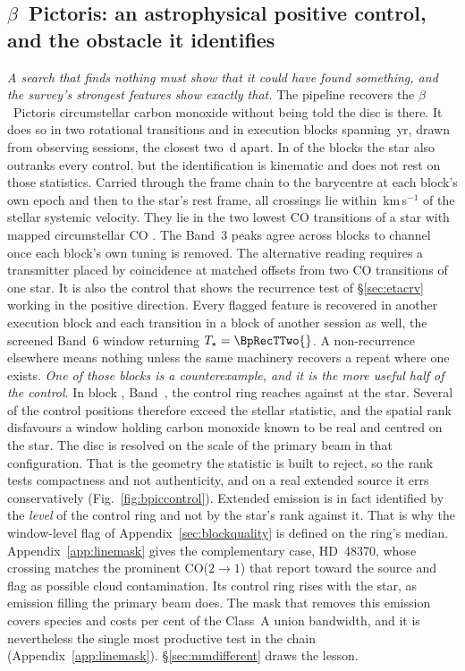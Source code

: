\subsection{$\beta$~Pictoris: an astrophysical positive control, and the
obstacle it identifies} \label{sec:bpicval}

\emph{A search that finds nothing must show that it could have found something,
and the survey's strongest features show exactly that.} The pipeline recovers
the $\beta$~Pictoris circumstellar carbon monoxide without being told the disc
is there. It does so in two rotational transitions and in \CsBpCoBlocks{}
execution blocks spanning \BpBaselineYr\,yr, drawn from \CsBpCoSess{} observing
sessions, the closest two \CsBpCoSepMinD\,d apart. In \NStageOneBpicEb{} of the
blocks the star also outranks every control, but the identification is
kinematic and does not rest on those statistics. Carried through the frame
chain to the barycentre at each block's own epoch and then to the star's rest
frame, all \BpicPanelNCo{} crossings lie within \BpicDvCoHi\,km\,s$^{-1}$ of the
stellar systemic velocity. They lie in the two lowest CO transitions of a star
with mapped circumstellar CO \citep{Dent2014,Matra2017}. The Band~3 peaks agree
across blocks to \BpRecThreeTuneChanMax{} channel once each block's own tuning
is removed. The alternative reading requires a transmitter placed by coincidence
at matched offsets from two CO transitions of one star. It is also the control
that shows the recurrence test of \S\ref{sec:etacrv} working in the positive
direction. Every flagged feature is recovered in another execution block and
each transition in a block of another session as well, the screened Band~6
window returning $T_\star=\BpRecTTwo{}$. A non-recurrence elsewhere means
nothing unless the same machinery recovers a repeat where one exists.
\emph{One of those blocks is a counterexample, and it is the more useful half of
the control}. In block \texttt{\BpCtrlBlock}, Band~\BpCtrlBand, the control ring
reaches \BpCtrlRingMax{} against \BpCtrlStar{} at the star. Several of the
\NCtrl{} control positions therefore exceed the stellar statistic, and the
spatial rank disfavours a window holding carbon monoxide known to be real and
centred on the star. The disc is resolved on the scale of the primary beam in that
configuration. That is the geometry the statistic is built to reject, so the
rank tests compactness and not authenticity, and on a real extended source it
errs conservatively (Fig.~\ref{fig:bpiccontrol}). Extended emission is in fact identified by the
\emph{level} of the control ring and not by the star's rank against it. That
is why the window-level flag of Appendix~\ref{sec:blockquality} is defined on
the ring's median. Appendix~\ref{app:linemask} gives the complementary case,
HD~48370, whose crossing matches the prominent CO($2{\to}1$) that
\citet{Cataldi2023} report toward the source and flag as possible cloud
contamination. Its control ring rises with the star, as emission filling the
primary beam does. The mask that removes
this emission covers \FrNSpec{} species and costs \MkMaskAPct{} per cent of the
Class~A union bandwidth, and it is nevertheless the single most productive test
in the chain (Appendix~\ref{app:linemask}). \S\ref{sec:mmdifferent} draws the
lesson.

